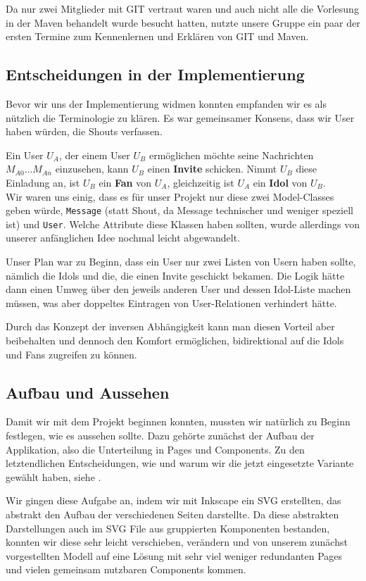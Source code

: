 \documentclass[12pt,a4paper]{article}
\begin{document}
Da nur zwei Mitglieder mit GIT vertraut waren und auch nicht alle die Vorlesung in der Maven behandelt wurde besucht hatten, nutzte unsere Gruppe ein paar der ersten Termine zum Kennenlernen und Erklären von GIT und Maven.

\subsection{Entscheidungen in der Implementierung}
Bevor wir uns der Implementierung widmen konnten empfanden wir es als nützlich die Terminologie zu klären. Es war gemeinsamer Konsens, dass wir User haben würden, die Shouts verfassen.

Ein User $U_A$, der einem User $U_B$ ermöglichen möchte seine Nachrichten $M_{A0} \dotsc M_{An}$ einzusehen, kann $U_B$ einen \textbf{Invite} schicken. Nimmt $U_B$ diese Einladung an, ist $U_B$ ein \textbf{Fan} von $U_A$, gleichzeitig ist $U_A$ ein \textbf{Idol} von $U_B$. \\

Wir waren uns einig, dass es für unser Projekt nur diese zwei Model-Classes geben würde, \verb+Message+ (statt Shout, da Message technischer und weniger speziell ist) und \verb+User+. Welche Attribute diese Klassen haben sollten, wurde allerdings von unserer anfänglichen Idee nochmal leicht abgewandelt. 

Unser Plan war zu Beginn, dass ein User nur zwei Listen von Usern haben sollte, nämlich die Idols und die, die einen Invite geschickt bekamen. Die Logik hätte dann einen Umweg über den jeweils anderen User und dessen Idol-Liste machen müssen, was aber doppeltes Eintragen von User-Relationen verhindert hätte.

Durch das Konzept der inversen Abhängigkeit  kann man diesen Vorteil aber beibehalten und dennoch den Komfort ermöglichen, bidirektional auf die Idols und Fans zugreifen zu können.

\subsection{Aufbau und Aussehen}
Damit wir mit dem Projekt beginnen konnten, mussten wir natürlich zu Beginn festlegen, wie es aussehen sollte. Dazu gehörte zunächst der Aufbau der Applikation, also die Unterteilung in Pages und Components. Zu den letztendlichen Entscheidungen, wie und warum wir die jetzt eingesetzte Variante gewählt haben, siehe .

Wir gingen diese Aufgabe an, indem wir mit Inkscape ein SVG erstellten, das abstrakt den Aufbau der verschiedenen Seiten darstellte. Da diese abstrakten Darstellungen auch im SVG File aus gruppierten Komponenten bestanden, konnten wir diese sehr leicht verschieben, verändern und von unserem zunächst vorgestellten Modell auf eine Lösung mit sehr viel weniger redundanten Pages und vielen gemeinsam nutzbaren Components kommen.
\end{document}
